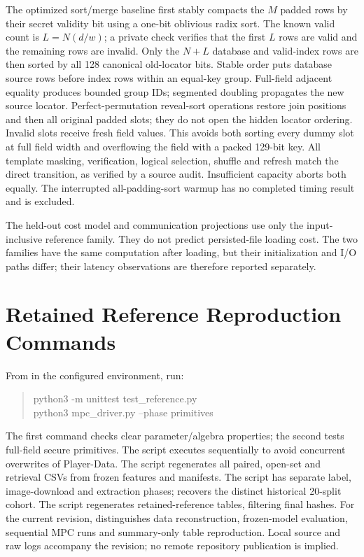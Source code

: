 \documentclass[journal,onecolumn]{IEEEtran}
\begin{document}
The optimized sort/merge baseline first stably compacts the $M$ padded rows by their secret validity bit using a one-bit oblivious radix sort. The known valid count is $L=N(d/w)$; a private check verifies that the first $L$ rows are valid and the remaining rows are invalid. Only the $N+L$ database and valid-index rows are then sorted by all 128 canonical old-locator bits. Stable order puts database source rows before index rows within an equal-key group. Full-field adjacent equality produces bounded group IDs; segmented doubling propagates the new source locator. Perfect-permutation reveal-sort operations restore join positions and then all original padded slots; they do not open the hidden locator ordering. Invalid slots receive fresh field values. This avoids both sorting every dummy slot at full field width and overflowing the field with a packed 129-bit key. All template masking, verification, logical selection, shuffle and refresh match the direct transition, as verified by a source audit. Insufficient capacity aborts both equally. The interrupted all-padding-sort warmup has no completed timing result and is excluded.

The held-out cost model and communication projections use only the input-inclusive reference family. They do not predict persisted-file loading cost. The two families have the same computation after loading, but their initialization and I/O paths differ; their latency observations are therefore reported separately.



\section{Retained Reference Reproduction Commands}\label{suppsec:supplement:8}
From  in the configured environment, run:
\begin{quote}\ttfamily
python3 -m unittest test\_reference.py\\
python3 mpc\_driver.py --phase primitives
\end{quote}
The first command checks clear parameter/algebra properties; the second tests full-field secure primitives. The script  executes sequentially to avoid concurrent overwrites of Player-Data. The script  regenerates all paired, open-set and retrieval CSVs from frozen features and manifests. The script  has separate label, image-download and extraction phases;  recovers the distinct historical 20-split cohort. The script  regenerates retained-reference tables, filtering final hashes. For the current revision,  distinguishes data reconstruction, frozen-model evaluation, sequential MPC runs and summary-only table reproduction. Local source and raw logs accompany the revision; no remote repository publication is implied.


\clearpage

\end{document}
